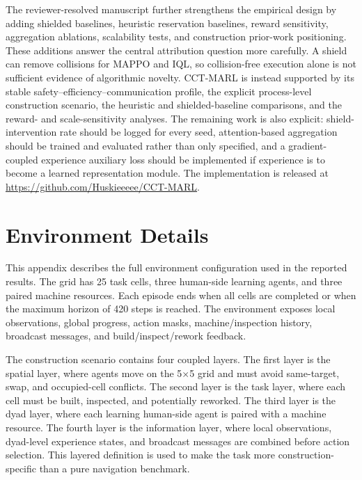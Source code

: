 \documentclass[preprint,12pt]{elsarticle}
\begin{document}
The reviewer-resolved manuscript further strengthens the empirical design by adding shielded baselines, heuristic reservation baselines, reward sensitivity, aggregation ablations, scalability tests, and construction prior-work positioning. These additions answer the central attribution question more carefully. A shield can remove collisions for MAPPO and IQL, so collision-free execution alone is not sufficient evidence of algorithmic novelty. CCT-MARL is instead supported by its stable safety--efficiency--communication profile, the explicit process-level construction scenario, the heuristic and shielded-baseline comparisons, and the reward- and scale-sensitivity analyses. The remaining work is also explicit: shield-intervention rate should be logged for every seed, attention-based aggregation should be trained and evaluated rather than only specified, and a gradient-coupled experience auxiliary loss should be implemented if experience is to become a learned representation module. The implementation is released at \url{https://github.com/Huskieeeee/CCT-MARL}.

\appendix

\section{Environment Details}

This appendix describes the full environment configuration used in the reported results. The grid has 25 task cells, three human-side learning agents, and three paired machine resources. Each episode ends when all cells are completed or when the maximum horizon of 420 steps is reached. The environment exposes local observations, global progress, action masks, machine/inspection history, broadcast messages, and build/inspect/rework feedback.

The construction scenario contains four coupled layers. The first layer is the spatial layer, where agents move on the 5$\times$5 grid and must avoid same-target, swap, and occupied-cell conflicts. The second layer is the task layer, where each cell must be built, inspected, and potentially reworked. The third layer is the dyad layer, where each learning human-side agent is paired with a machine resource. The fourth layer is the information layer, where local observations, dyad-level experience states, and broadcast messages are combined before action selection. This layered definition is used to make the task more construction-specific than a pure navigation benchmark.
\end{document}
